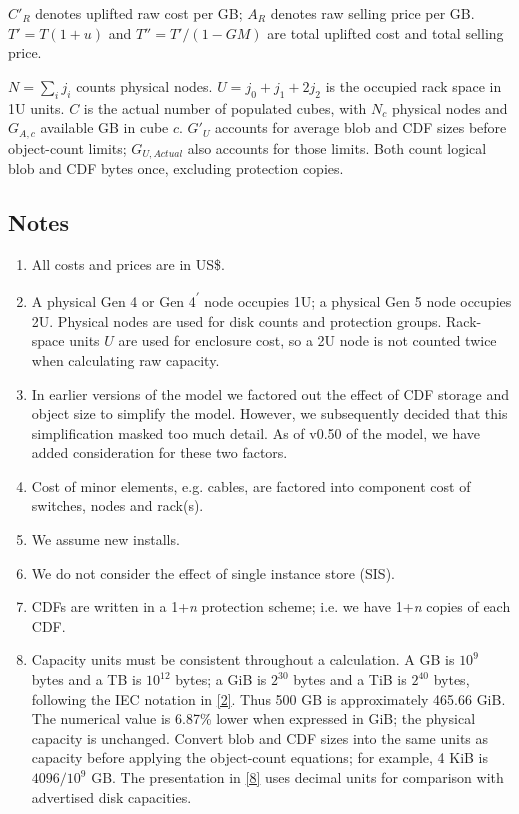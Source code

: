 \par\endgroup

\(C'_R\) denotes uplifted raw cost per GB; \(A_R\) denotes raw selling price per GB. \(T'=T(1+u)\) and \(T''=T'/(1-GM)\) are total uplifted cost and total selling price.

\(N=\sum_i j_i\) counts physical nodes. \(U=j_0+j_1+2j_2\) is the
occupied rack space in 1U units. \(C\) is the actual number of populated
cubes, with \(N_c\) physical nodes and \(G_{A,c}\) available GB in cube \(c\).
\(G'_U\) accounts for average blob and CDF sizes before object-count limits;
\(G_{U,Actual}\) also accounts for those limits. Both count logical blob
and CDF bytes once, excluding protection copies.

\subsection{Notes}\label{notes-3}

\begin{enumerate}
\def\labelenumi{\arabic{enumi}.}
\tightlist
\item
  All costs and prices are in US\$.
\item
  \label{note:normalization}A physical Gen 4 or Gen 4\textsuperscript{\ensuremath{\prime}}
  node occupies 1U; a physical Gen 5 node occupies 2U. Physical nodes are used
  for disk counts and protection groups. Rack-space units \(U\) are used
  for enclosure cost, so a 2U node is not counted twice when calculating raw capacity.
\item
  In earlier versions of the model we factored out the effect of CDF storage and object size to simplify the model. However, we subsequently decided that this simplification masked too much detail. As of v0.50 of the model, we have added consideration for these two factors.
\item
  Cost of minor elements, e.g. cables, are factored into component cost of switches, nodes and rack(s).
\item
  We assume new installs.
\item
  We do not consider the effect of single instance store (SIS).
\item
  CDFs are written in a 1+\emph{n} protection scheme; i.e. we have 1+\emph{n} copies of each CDF.
\item
  Capacity units must be consistent throughout a calculation. A GB is
  \(10^9\) bytes and a TB is \(10^{12}\) bytes; a GiB is \(2^{30}\) bytes
  and a TiB is \(2^{40}\) bytes, following the IEC notation in
  \hyperref[ref:2]{[2]}. Thus 500 GB is approximately 465.66 GiB.
  The numerical value is 6.87\% lower when expressed in GiB; the physical
  capacity is unchanged. Convert blob and CDF sizes into the same units as
  capacity before applying the object-count equations; for example,
  4 KiB is \(4096/10^9\) GB. The presentation in \hyperref[ref:8]{[8]}
  uses decimal units for comparison with advertised disk capacities.
\end{enumerate}
